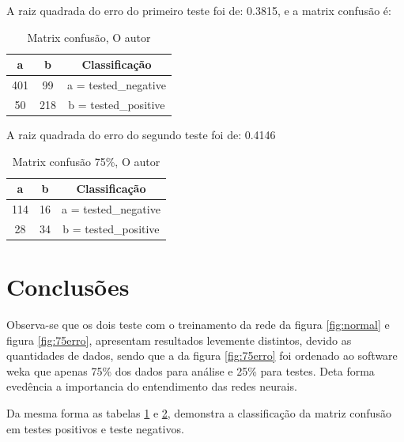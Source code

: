 \par A raiz quadrada do erro do primeiro teste foi de: 0.3815, e a matrix confusão é:
\begin{table}[h!]
\center
  \begin{tabular}{| c | c | c |}
  \hline
    a & b & Classificação\\
    \hline
    401 & 99 &  a = tested\_negative\\
    50 & 218 &  b = tested\_positive\\
    \hline
  \end{tabular}
  \caption{Matrix confusão, O autor}
  \label{tab:normal}
\end{table}
\par A raiz quadrada do erro do segundo teste foi de: 0.4146
\begin{table}[h!]
\center
  \begin{tabular}{| c | c | c |}
  \hline
    a & b & Classificação\\
    \hline
    114 & 16 &  a = tested\_negative\\
    28 & 34 &  b = tested\_positive\\
    \hline
  \end{tabular}
\caption{Matrix confusão 75\%, O autor}
\label{tab:75}
\end{table}
\section{Conclusões}
\par Observa-se que os dois teste com o treinamento da rede da figura \ref{fig:normal} e figura \ref{fig:75erro}, apresentam resultados levemente distintos, devido as quantidades de dados, sendo que a da figura \ref{fig:75erro} foi ordenado ao software weka que apenas 75\% dos dados para análise e 25\% para testes. Deta forma evedência a importancia do entendimento das redes neurais.
\par Da mesma forma as tabelas \ref{tab:normal} e \ref{tab:75}, demonstra a classificação da matriz confusão em testes positivos e teste negativos.



